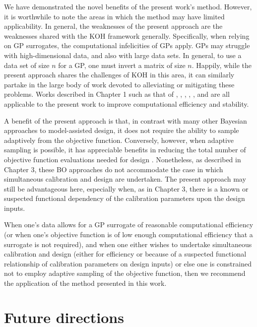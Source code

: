 \documentclass[10pt,a4paper]{article}
\begin{document}
We have demonstrated the novel benefits of the present work's method.
However, it is worthwhile to note the areas in which the method may have limited applicability.
In general, the weaknesses of the present approach are the weaknesses shared with the KOH framework generally.
Specifically, when relying on GP surrogates, the computational infelicities of GPs apply.
GPs may struggle with high-dimensional data, and also with large data sets.
In general, to use a data set of size $n$ for a GP, one must invert a matrix of size $n$.
Happily, while the present approach shares the challenges of KOH in this area, it can similarly partake in the large body of work devoted to alleviating or mitigating these problems.
Works described in Chapter 1 such as that of  \citet{Higdon2008a}, \citet{Bhat2010}, \citet{Paulo2012}, \citet{Drignei2012}, \citet{Pratola2013}, and \citet{Higdon2013} are all applicable to the present work to improve computational efficiency and stability.

A benefit of the present approach is that, in contrast with many other Bayesian approaches to model-assisted design, it does not require the ability to sample adaptively from the objective function.
Conversely, however, when adaptive sampling is possible, it has appreciable benefits in reducing the total number of objective function evaluations needed for design \citep{Jones1998,Vazquez2009,Bect2012,Chevalier2014}.
Nonetheless, as described in Chapter 3, these BO approaches do not accommodate the case in which simultaneous calibration and design are undertaken.
The present approach may still be advantageous here, especially when, as in Chapter 3, there is a known or suspected functional dependency of the calibration parameters upon the design inputs.

When one's data allows for a GP surrogate of reasonable computational efficiency (or when one's objective function is of low enough computational efficiency that a surrogate is not required), and when one either wishes to undertake simultaneous calibration and design (either for efficiency or because of a suspected functional relationship of calibration parameters on design inputs) or else one is constrained not to employ adaptive sampling of the objective function, then we recommend the application of the method presented in this work.

\section{Future directions}




	
\end{document}
